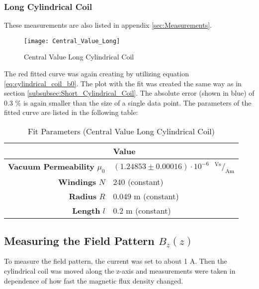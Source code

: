 \subsubsection{Long Cylindrical Coil}
\label{subsubsec:Long_Cylindrical_Coil}
These measurements are also listed in appendix \ref{sec:Measurements}.
\begin{figure}[H]
	\centering
	\texttt{[image: Central\_Value\_Long]}
	\caption{Central Value Long Cylindrical Coil}
	\label{fig:Central_Value_Long}
\end{figure}
The red fitted curve was again creating by utilizing equation \ref{eq:cylindrical_coil_b0}. The plot with the fit was created the same way as in section \ref{subsubsec:Short_Cylindrical_Coil}. The absolute error (shown in blue) of 0.3 \% is again smaller than the size of a single data point. The parameters of the fitted curve are listed in the following table:
\begin{table}[H]
	\centering
	\renewcommand{\arraystretch}{1.3}
	\begin{tabular}{r|l}
		& \textbf{Value} \\
		\hline\hline
		\textbf{Vacuum Permeability} $\mu_0$ & $(1.24853\pm0.00016)\cdot10^{-6}$\ $\,^\text{Vs}\!/_\text{Am}$ \\
		\textbf{Windings} $N$ & 240 (constant) \\
		\textbf{Radius} $R$ & 0.049 m (constant) \\
		\textbf{Length} $l$ & 0.2 m (constant) \\
	\end{tabular}
	\caption{Fit Parameters (Central Value Long Cylindrical Coil)}
	\label{tab:Central_Value_Long}
\end{table}
\newpage
\subsection{Measuring the Field Pattern $B_z(z)$}
\label{subsec:Measuring_the_Field_Pattern}
To measure the field pattern, the current was set to about 1 A. Then the cylindrical coil was moved along the z-axis and measurements were taken in dependence of how fast the magnetic flux density changed.
